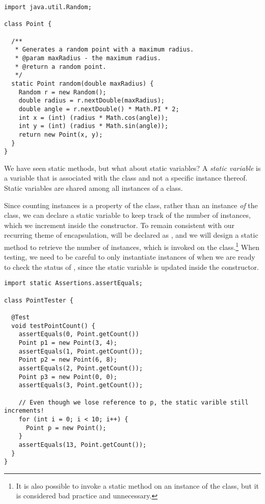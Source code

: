 \begin{lstlisting}[language=MyJava]
import java.util.Random;

class Point {

  /**
   * Generates a random point with a maximum radius.
   * @param maxRadius - the maximum radius.
   * @return a random point.
   */
  static Point random(double maxRadius) {
    Random r = new Random();
    double radius = r.nextDouble(maxRadius);
    double angle = r.nextDouble() * Math.PI * 2;
    int x = (int) (radius * Math.cos(angle));
    int y = (int) (radius * Math.sin(angle));
    return new Point(x, y);
  }
}
\end{lstlisting}

We have seen static methods, but what about static variables? 
A \emph{static variable} is a variable that is associated with the class and not a specific instance thereof. 
Static variables are shared among all instances of a class.

Since counting instances is a property of the  class, rather than an instance \emph{of} the class, we can declare a static variable  to keep track of the number of instances, which we increment inside the constructor. 
To remain consistent with our recurring theme of encapsulation,  will be declared as , and we will design a static method  to retrieve the number of instances, which is invoked on the class.\footnote{It is also possible to invoke a static method on an instance of the class, but it is considered bad practice and unnecessary.} 
When testing, we need to be careful to only instantiate instances of  when we are ready to check the status of , since the static  variable is updated inside the constructor.

\enlargethispage{-5\baselineskip}
\begin{lstlisting}[language=MyJava]
import static Assertions.assertEquals;

class PointTester {

  @Test
  void testPointCount() {
    assertEquals(0, Point.getCount())
    Point p1 = new Point(3, 4);
    assertEquals(1, Point.getCount());
    Point p2 = new Point(6, 8);
    assertEquals(2, Point.getCount());
    Point p3 = new Point(0, 0);
    assertEquals(3, Point.getCount());

    // Even though we lose reference to p, the static varible still increments!
    for (int i = 0; i < 10; i++) {
      Point p = new Point();
    }
    assertEquals(13, Point.getCount());
  }
}
\end{lstlisting}

